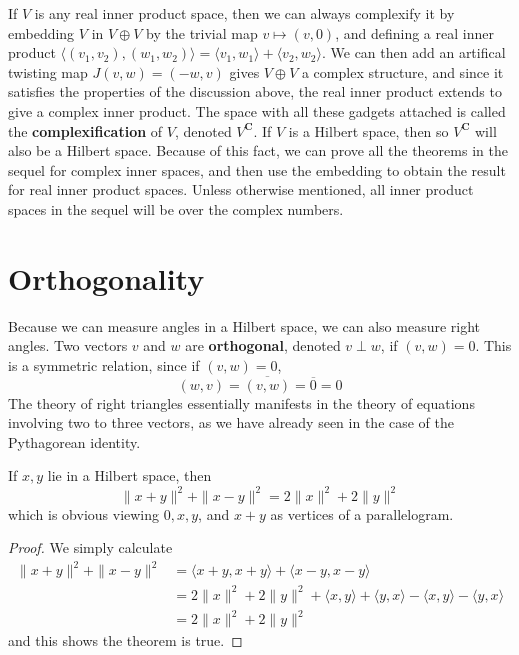 If $V$ is any real inner product space, then we can always complexify it by embedding $V$ in $V \oplus V$ by the trivial map $v \mapsto (v,0)$, and defining a real inner product $\langle (v_1,v_2), (w_1,w_2) \rangle = \langle v_1,w_1 \rangle + \langle v_2,w_2 \rangle$. We can then add an artifical twisting map $J(v,w) = (-w,v)$ gives $V \oplus V$ a complex structure, and since it satisfies the properties of the discussion above, the real inner product extends to give a complex inner product. The space with all these gadgets attached is called the {\bf complexification} of $V$, denoted $V^\mathbf{C}$. If $V$ is a Hilbert space, then so $V^\mathbf{C}$ will also be a Hilbert space. Because of this fact, we can prove all the theorems in the sequel for complex inner spaces, and then use the embedding to obtain the result for real inner product spaces. Unless otherwise mentioned, all inner product spaces in the sequel will be over the complex numbers.

\section{Orthogonality}

Because we can measure angles in a Hilbert space, we can also measure right angles. Two vectors $v$ and $w$ are {\bf orthogonal}, denoted $v \perp w$, if $(v,w) = 0$. This is a symmetric relation, since if $(v,w) = 0$,
%
\[ (w,v) = \overline{(v,w)} = \overline{0} = 0 \]
%
The theory of right triangles essentially manifests in the theory of equations involving two to three vectors, as we have already seen in the case of the Pythagorean identity.

\begin{theorem}
    If $x,y$ lie in a Hilbert space, then
    \[ \| x + y \|^2 + \| x - y \|^2 = 2 \| x \|^2 + 2 \| y \|^2 \]
    which is obvious viewing $0, x, y$, and $x + y$ as vertices of a parallelogram.
\end{theorem}
\begin{proof}
    We simply calculate
    \begin{align*}
        \| x + y \|^2 + \| x - y \|^2 &= \langle x + y, x + y \rangle + \langle x - y, x - y \rangle\\
        &= 2 \| x \|^2 + 2 \| y \|^2 + \langle x, y \rangle + \langle y, x \rangle - \langle x, y \rangle - \langle y, x \rangle\\
        &= 2 \| x \|^2 + 2 \| y \|^2
    \end{align*}
    and this shows the theorem is true.
\end{proof}

